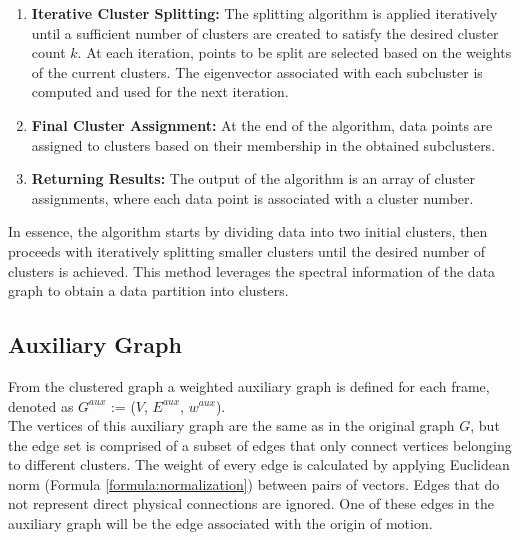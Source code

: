 \begin{enumerate}
  \item \textbf{Iterative Cluster Splitting:}
  The splitting algorithm is applied iteratively until a sufficient number of clusters are created to satisfy the desired cluster count $k$.
  At each iteration, points to be split are selected based on the weights of the current clusters.
  The eigenvector associated with each subcluster is computed and used for the next iteration.
  
  \item \textbf{Final Cluster Assignment:}
  At the end of the algorithm, data points are assigned to clusters based on their membership in the obtained subclusters.
  
  \item \textbf{Returning Results:}
  The output of the algorithm is an array of cluster assignments, where each data point is associated with a cluster number.
  
\end{enumerate}

In essence, the algorithm starts by dividing data into two initial clusters, then proceeds with iteratively splitting smaller clusters until the desired number of clusters is achieved.
This method leverages the spectral information of the data graph to obtain a data partition into clusters.


\subsection{Auxiliary Graph}
From the clustered graph a weighted auxiliary graph is defined for each frame, denoted as $G^{aux}$ := ($V$, $E^{aux}$, $w^{aux}$). \\
The vertices of this auxiliary graph are the same as in the original graph $G$, but the edge set is comprised of a subset of edges that only connect vertices belonging to different clusters.
The weight of every edge is calculated by applying Euclidean norm (Formula \ref{formula:normalization}) between pairs of vectors.
Edges that do not represent direct physical connections are ignored.
One of these edges in the auxiliary graph will be the edge associated with the origin of motion.
\\

